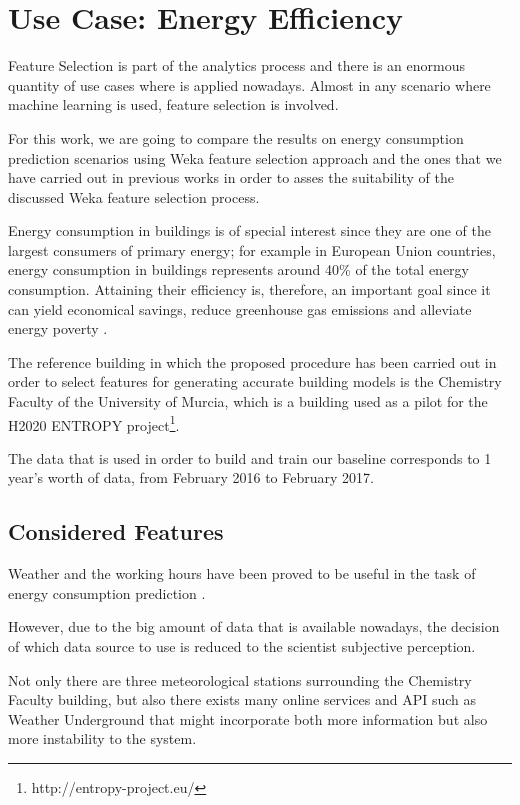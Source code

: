 \documentclass[journal,twoside,web]{ieeecolor}
\begin{document}
\section{Use Case: Energy Efficiency}

Feature Selection is part of the analytics process and there is an enormous quantity of use cases where is applied nowadays. Almost in any scenario where machine learning is used, feature selection is involved.

For this work, we are going to compare the results on energy consumption prediction scenarios using Weka feature selection approach and the ones that we have carried out in previous works in order to asses the suitability of the discussed Weka feature selection process.

Energy consumption in buildings is of special interest since they are one of the largest consumers of primary energy; for example in European Union countries, energy consumption in buildings represents around 40\% of the total energy consumption. Attaining their efficiency is, therefore, an important goal since it can yield economical savings, reduce greenhouse gas emissions and alleviate energy poverty \cite{Gonzalez2017}.

The reference building in which the proposed procedure has been carried out in order to select features for generating accurate building models is the Chemistry Faculty of the University of Murcia, which is a building used as a pilot for the H2020 ENTROPY project\footnote{http://entropy-project.eu/}.  

The data that is used in order to build and train our baseline corresponds to 1 year's worth of data, from February 2016 to February 2017. 


\subsection{Considered Features}

Weather and the working hours have been proved to be useful in the task of energy consumption prediction \cite{gonzalez2016towards}.

However, due to the big amount of data that is available nowadays, the decision of which data source to use is reduced to the scientist subjective perception.

Not only there are three meteorological stations surrounding the Chemistry Faculty building, but also there exists many online services and API such as Weather Underground that might incorporate both more information but also more instability to the system. 
\end{document}
